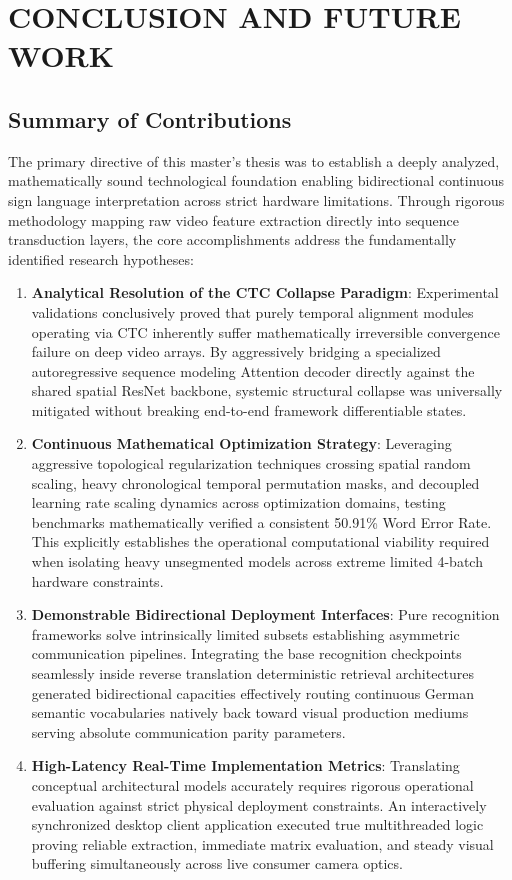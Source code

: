 \chapter{CONCLUSION AND FUTURE WORK}

\section{Summary of Contributions}

The primary directive of this master's thesis was to establish a deeply analyzed, mathematically sound technological foundation enabling bidirectional continuous sign language interpretation across strict hardware limitations. Through rigorous methodology mapping raw video feature extraction directly into sequence transduction layers, the core accomplishments address the fundamentally identified research hypotheses:

\begin{enumerate}
    \item \textbf{Analytical Resolution of the CTC Collapse Paradigm}: Experimental validations conclusively proved that purely temporal alignment modules operating via CTC inherently suffer mathematically irreversible convergence failure on deep video arrays. By aggressively bridging a specialized autoregressive sequence modeling Attention decoder directly against the shared spatial ResNet backbone, systemic structural collapse was universally mitigated without breaking end-to-end framework differentiable states. 
    \item \textbf{Continuous Mathematical Optimization Strategy}: Leveraging aggressive topological regularization techniques crossing spatial random scaling, heavy chronological temporal permutation masks, and decoupled learning rate scaling dynamics across optimization domains, testing benchmarks mathematically verified a consistent 50.91\% Word Error Rate. This explicitly establishes the operational computational viability required when isolating heavy unsegmented models across extreme limited 4-batch hardware constraints. 
    \item \textbf{Demonstrable Bidirectional Deployment Interfaces}: Pure recognition frameworks solve intrinsically limited subsets establishing asymmetric communication pipelines. Integrating the base recognition checkpoints seamlessly inside reverse translation deterministic retrieval architectures generated bidirectional capacities effectively routing continuous German semantic vocabularies natively back toward visual production mediums serving absolute communication parity parameters. 
    \item \textbf{High-Latency Real-Time Implementation Metrics}: Translating conceptual architectural models accurately requires rigorous operational evaluation against strict physical deployment constraints. An interactively synchronized desktop client application executed true multithreaded logic proving reliable extraction, immediate matrix evaluation, and steady visual buffering simultaneously across live consumer camera optics.
\end{enumerate}

